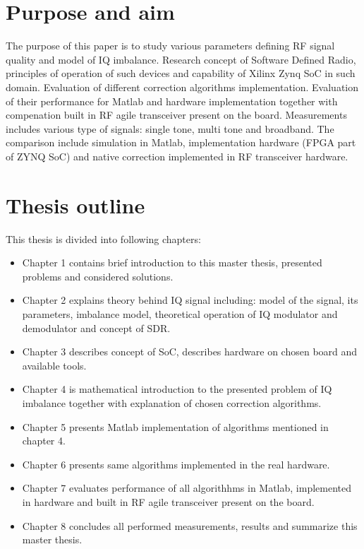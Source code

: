 \documentclass[en,printmode]{mgr}
\begin{document}
	\section{Purpose and aim}
			The purpose of this paper is to study various parameters defining RF signal quality and model of IQ
		imbalance. Research concept of Software Defined Radio, principles of operation of such devices and capability
		of Xilinx Zynq SoC in such domain. Evaluation of different correction algorithms implementation. Evaluation
		of their performance for Matlab and hardware implementation together with compenation built in RF agile
		transceiver present on the board. Measurements includes various type of signals: single tone, multi tone 
		and broadband.
		The comparison include simulation in Matlab, implementation hardware (FPGA part of ZYNQ SoC) and
		native correction implemented in RF transceiver hardware.
		
	\section{Thesis outline}
		This thesis is divided into following chapters:
		\begin{itemize}
			\item Chapter 1 contains brief introduction to this master thesis, presented problems and
				  considered solutions.
			\item Chapter 2 explains theory behind IQ signal including: model of the signal, its parameters,
			      imbalance model, theoretical operation of IQ modulator and demodulator and concept of SDR.
			\item Chapter 3 describes concept of SoC, describes hardware on chosen board and available tools.
			\item Chapter 4 is mathematical introduction to the presented problem of IQ imbalance together
			      with explanation of chosen correction algorithms.
			\item Chapter 5 presents Matlab implementation of algorithms mentioned in chapter 4.
			\item Chapter 6 presents same algorithms implemented in the real hardware.
			\item Chapter 7 evaluates performance of all algorithhms in Matlab, implemented in hardware
			      and built in RF agile transceiver present on the board.
			\item Chapter 8 concludes all performed measurements, results and summarize this master thesis.
		\end{itemize}			
\end{document}

